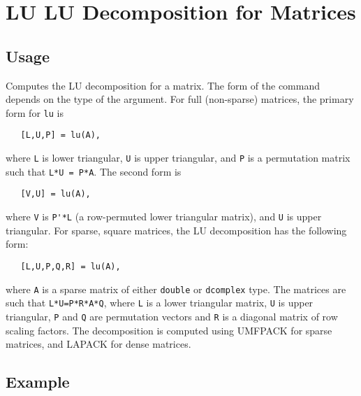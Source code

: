\section{LU LU Decomposition for Matrices}

\subsection{Usage}

Computes the LU decomposition for a matrix.  The form of the
command depends on the type of the argument.  For full (non-sparse)
matrices, the primary form for \verb|lu| is
\begin{verbatim}
   [L,U,P] = lu(A),
\end{verbatim}
where \verb|L| is lower triangular, \verb|U| is upper triangular, and
\verb|P| is a permutation matrix such that \verb|L*U = P*A|.  The second form is
\begin{verbatim}
   [V,U] = lu(A),
\end{verbatim}
where \verb|V| is \verb|P'*L| (a row-permuted lower triangular matrix), 
and \verb|U| is upper triangular.  For sparse, square matrices,
the LU decomposition has the following form:
\begin{verbatim}
   [L,U,P,Q,R] = lu(A),
\end{verbatim}
where \verb|A| is a sparse matrix of either \verb|double| or \verb|dcomplex| type.
The matrices are such that \verb|L*U=P*R*A*Q|, where \verb|L| is a lower triangular
matrix, \verb|U| is upper triangular, \verb|P| and \verb|Q| are permutation vectors
and \verb|R| is a diagonal matrix of row scaling factors.  The decomposition
 is computed using UMFPACK for sparse matrices, and LAPACK for dense
 matrices.
\subsection{Example}

